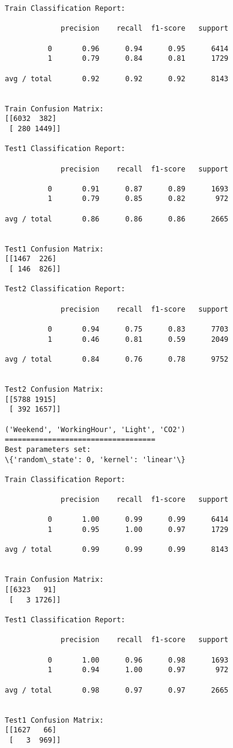 \documentclass[11pt]{article}
\begin{document}
\begin{Verbatim}[commandchars=\\\{\}]
Train Classification Report:

             precision    recall  f1-score   support

          0       0.96      0.94      0.95      6414
          1       0.79      0.84      0.81      1729

avg / total       0.92      0.92      0.92      8143


Train Confusion Matrix:
[[6032  382]
 [ 280 1449]]

Test1 Classification Report:

             precision    recall  f1-score   support

          0       0.91      0.87      0.89      1693
          1       0.79      0.85      0.82       972

avg / total       0.86      0.86      0.86      2665


Test1 Confusion Matrix:
[[1467  226]
 [ 146  826]]

Test2 Classification Report:

             precision    recall  f1-score   support

          0       0.94      0.75      0.83      7703
          1       0.46      0.81      0.59      2049

avg / total       0.84      0.76      0.78      9752


Test2 Confusion Matrix:
[[5788 1915]
 [ 392 1657]]

('Weekend', 'WorkingHour', 'Light', 'CO2')
===================================
Best parameters set:
\{'random\_state': 0, 'kernel': 'linear'\}

Train Classification Report:

             precision    recall  f1-score   support

          0       1.00      0.99      0.99      6414
          1       0.95      1.00      0.97      1729

avg / total       0.99      0.99      0.99      8143


Train Confusion Matrix:
[[6323   91]
 [   3 1726]]

Test1 Classification Report:

             precision    recall  f1-score   support

          0       1.00      0.96      0.98      1693
          1       0.94      1.00      0.97       972

avg / total       0.98      0.97      0.97      2665


Test1 Confusion Matrix:
[[1627   66]
 [   3  969]]


\end{Verbatim}
\end{document}
